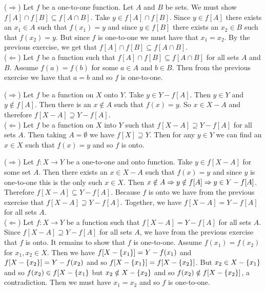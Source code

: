 \documentclass[11pt]{book}
\begin{document}
\begin{enumerate}
{($\Rightarrow$) Let $f$ be a one-to-one function. Let $A$ and $B$ be sets. We must show $f[A]\cap f[B]\subseteq f[A\cap B]$. Take $y\in f[A]\cap f[B]$. Since $y\in f[A]$ there exists an $x_1\in A$ such that $f(x_1)=y$ and since $y\in f[B]$ there exists an $x_2\in B$ such that $f(x_2)=y$. But since $f$ is one-to-one we must have that $x_1=x_2$. By the previous exercise, we get that $f[A]\cap f[B]\subseteq f[A\cap B]$.\\($\Leftarrow$) Let $f$ be a function such that $f[A]\cap f[B]\subseteq f[A\cap B]$ for all sets $A$ and $B$. Assume $f(a)=f(b)$ for some $a\in A$ and $b\in B$. Then from the previous exercise we have that $a=b$ and so $f$ is one-to-one.}

{($\Rightarrow$) Let $f$ be a function on $X$ onto $Y$. Take $y\in Y-f[A]$. Then $y\in Y$ and $y\notin f[A]$. Then there is an $x\notin A$ such that $f(x)=y$. So $x\in X-A$ and therefore $f[X-A]\supseteq Y-f[A]$.\\($\Leftarrow$) Let $f$ be a function on $X$ into $Y$ such that $f[X-A]\supseteq Y-f[A]$ for all sets $A$. Then taking $A=\emptyset$ we have $f[X]\supseteq Y$. Then for any $y\in Y$ we can find an $x\in X$ such that $f(x)=y$ and so $f$ is onto.}

{($\Rightarrow$) Let $f:X\rightarrow Y$ be a one-to-one and onto function. Take $y\in f[X-A]$ for some set $A$. Then there exists an $x\in X-A$ such that $f(x)=y$ and since $y$ is one-to-one this is the only such $x\in X$. Then $x\notin A \Rightarrow y\notin f[A] \Rightarrow y\in Y-f[A]$. Therefore $f[X-A]\subseteq Y-f[A]$. Because $f$ is onto we have from the previous exercise that $f[X-A]\supseteq Y-f[A]$. Together, we have $f[X-A]=Y-f[A]$ for all sets $A$.\\($\Leftarrow$) Let $f:X\rightarrow Y$ be a function such that $f[X-A]=Y-f[A]$ for all sets $A$. Since $f[X-A]\supseteq Y-f[A]$ for all sets $A$, we have from the previous exercise that $f$ is onto. It remains to show that $f$ is one-to-one. Assume $f(x_1)=f(x_2)$ for $x_1,x_2\in X$. Then we have $f[X-\{x_1\}]=Y-f(x_1)$ and $f[X-\{x_2\}]=Y-f(x_2)$ and so $f[X-\{x_1\}]=f[X-\{x_2\}]$. But $x_2\in X-\{x_1\}$ and so $f(x_2)\in f[X-\{x_1\}$ but $x_2\notin X-\{x_2\}$ and so $f(x_2)\notin f[X-\{x_2\}]$, a contradiction. Then we must have $x_1=x_2$ and so $f$ is one-to-one.}

\end{enumerate}
\end{document}
